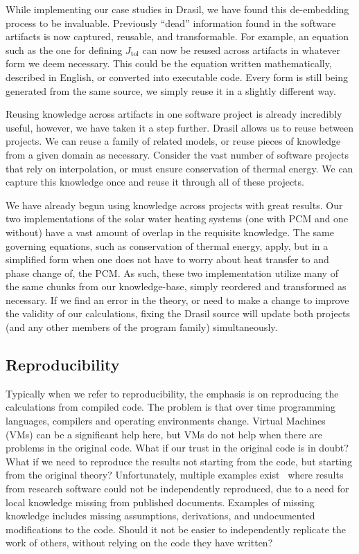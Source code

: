 \documentclass[sigconf]{acmart}
\newcommand{\jtol}{$J_{\mbox{tol}}$}
\begin{document}
{While implementing our case studies in Drasil, we have found this de-embedding 
process to be invaluable. Previously ``dead'' information found in the software 
artifacts is now captured, reusable, and transformable. For example, an equation 
such as the one for defining \jtol{} can now be reused across artifacts in 
whatever form we deem necessary. This could be the equation written 
mathematically, described in English, or converted into executable code. Every 
form is still being generated from the same source, we simply reuse it in a 
slightly different way.

Reusing knowledge across artifacts in one software project is already 
incredibly useful, however, we have taken it a step further. Drasil allows us 
to reuse between projects. We can reuse a family of related models, or reuse 
pieces of knowledge from a given domain as necessary. Consider the vast number 
of software projects that rely on interpolation, or must ensure conservation of thermal 
energy. We can capture this knowledge once and reuse it through all of these 
projects.

We have already begun using knowledge across projects with great results. Our
two implementations of the solar water heating systems (one with PCM and one
without) have a vast amount of overlap in the requisite knowledge.  The same
governing equations, such as conservation of thermal energy, apply, but in a
simplified form when one does not have to worry about heat transfer to and phase
change of, the PCM. As such, these two implementation utilize many of the same
chunks from our knowledge-base, simply reordered and transformed as
necessary. If we find an error in the theory, or need to make a change to
improve the validity of our calculations, fixing the Drasil source will update
both projects (and any other members of the program family) simultaneously.  

\subsection{Reproducibility}

Typically when we refer to reproducibility, the emphasis is on reproducing the
calculations from compiled code. The problem is that over time programming
languages, compilers and operating environments change.  Virtual Machines (VMs)
can be a significant help here, but VMs do not help when there are problems in
the original code.  What if our trust in the original code is in doubt?  What if
we need to reproduce the results not starting from the code, but starting from
the original theory?  Unfortunately, multiple examples
exist~\cite{CrickAndHall2014, IonescuAndJansson2013} where results from research
software could not be independently reproduced, due to a need for local
knowledge missing from published documents.  Examples of missing knowledge
includes missing assumptions, derivations, and undocumented modifications
to the code.  Should it not be easier to independently replicate the work of
others, without relying on the code they have written?

}
\end{document}
